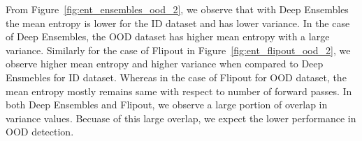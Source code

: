     From Figure~\ref{fig:ent_ensembles_ood_2}, we observe that with Deep Ensembles the mean entropy is lower for the ID dataset and has lower variance.
    In the case of Deep Ensembles, the OOD dataset has higher mean entropy with a large variance.
    Similarly for the case of Flipout in Figure~\ref{fig:ent_flipout_ood_2}, we observe higher mean entropy and higher variance when compared to Deep Ensmebles for ID dataset.
    Whereas in the case of Flipout for OOD dataset, the mean entropy mostly remains same with respect to number of forward passes.
    In both Deep Ensembles and Flipout, we observe a large portion of overlap in variance values.
    Becuase of this large overlap, we expect the lower performance in OOD detection.
    

